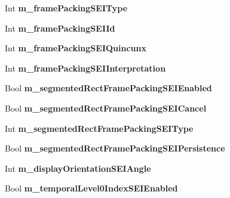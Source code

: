 \begin{DoxyCompactItemize}
\item 
\mbox{\label{class_t_app_enc_cfg_acf2588c6b8de339ef71d0c987e1da3c0}} 
Int {\bfseries m\+\_\+frame\+Packing\+S\+E\+I\+Type}
\item 
\mbox{\label{class_t_app_enc_cfg_a7a9b7224786b2dcb07462357dd48fbfe}} 
Int {\bfseries m\+\_\+frame\+Packing\+S\+E\+I\+Id}
\item 
\mbox{\label{class_t_app_enc_cfg_ab8e8af489e83218ce8171549e034fcc4}} 
Int {\bfseries m\+\_\+frame\+Packing\+S\+E\+I\+Quincunx}
\item 
\mbox{\label{class_t_app_enc_cfg_a688e27a875cd97bcd89e62da88b62f91}} 
Int {\bfseries m\+\_\+frame\+Packing\+S\+E\+I\+Interpretation}
\item 
\mbox{\label{class_t_app_enc_cfg_adb6d7ea09906348409cca7704832c376}} 
Bool {\bfseries m\+\_\+segmented\+Rect\+Frame\+Packing\+S\+E\+I\+Enabled}
\item 
\mbox{\label{class_t_app_enc_cfg_a21de303524ecd265137c4b1b5c5cdc6f}} 
Bool {\bfseries m\+\_\+segmented\+Rect\+Frame\+Packing\+S\+E\+I\+Cancel}
\item 
\mbox{\label{class_t_app_enc_cfg_a881a120d4fcafb351e1a28ddf3ad9bdb}} 
Int {\bfseries m\+\_\+segmented\+Rect\+Frame\+Packing\+S\+E\+I\+Type}
\item 
\mbox{\label{class_t_app_enc_cfg_af1760da67f89bfd61cd8d7223a17fff3}} 
Bool {\bfseries m\+\_\+segmented\+Rect\+Frame\+Packing\+S\+E\+I\+Persistence}
\item 
\mbox{\label{class_t_app_enc_cfg_adb92cdb4163c5919f4d3f1e6e74fcfa9}} 
Int {\bfseries m\+\_\+display\+Orientation\+S\+E\+I\+Angle}
\item 
\mbox{\label{class_t_app_enc_cfg_afb9691fc3a7cc9147909d49a310d41ed}} 
Bool {\bfseries m\+\_\+temporal\+Level0\+Index\+S\+E\+I\+Enabled}
\item 
\mbox{\label{class_t_app_enc_cfg_a29afb4c2b5becb3f7f06a52f5accbaaf}} 

\end{DoxyCompactItemize}
